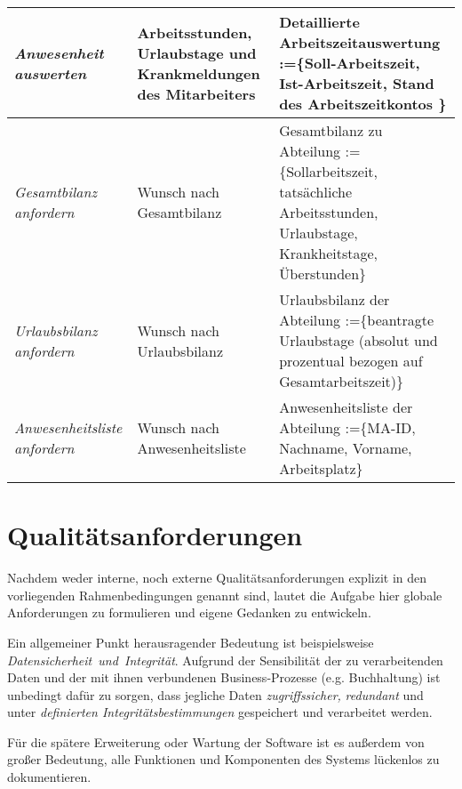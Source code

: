 {\begin{tabular}{|p{3cm}|p{6cm}|p{6cm}|}
	\hline \hline
		\textit{Anwesenheit \newline auswerten} &
		Arbeitsstunden, Urlaubstage und Krankmeldungen des Mitarbeiters&
		Detaillierte Arbeitszeitauswertung :=\{Soll-Arbeitszeit, Ist-Arbeitszeit, Stand des Arbeitszeitkontos \} \\
	\hline \hline
		\textit{Gesamtbilanz \newline anfordern} &
		Wunsch nach Gesamtbilanz &
		Gesamtbilanz zu Abteilung :=\{Sollarbeitszeit, tats\"achliche Arbeitsstunden, Urlaubstage, Krankheitstage, \"Uberstunden\}\\
	\hline
		\textit{Urlaubsbilanz \newline anfordern} &
		Wunsch nach Urlaubsbilanz&
		Urlaubsbilanz der Abteilung :=\{beantragte Urlaubstage (absolut und prozentual bezogen auf Gesamtarbeitszeit)\}\\
	\hline
		\textit{Anwesenheitsliste \newline anfordern} &
		Wunsch nach Anwesenheitsliste &
		Anwesenheitsliste der Abteilung :=\{MA-ID, Nachname, Vorname, Arbeitsplatz\} \\
	\hline
\end{tabular}
}


\newpage
\section{Qualit\"atsanforderungen}
Nachdem weder interne, noch externe Qualit\"atsanforderungen explizit in den vorliegenden Rahmenbedingungen genannt sind, lautet die Aufgabe hier globale Anforderungen zu formulieren und eigene Gedanken zu entwickeln. \newline

Ein allgemeiner Punkt herausragender Bedeutung ist beispielsweise \newline \mbox{\textit{Datensicherheit und Integrit\"at}}. Aufgrund der Sensibilit\"at der zu verarbeitenden Daten und der mit ihnen verbundenen Business-Prozesse (e.g. Buchhaltung) ist unbedingt daf\"ur zu sorgen, dass jegliche Daten \textit{zugriffssicher,} \textit{redundant} und unter \textit{definierten Integrit\"atsbestimmungen} gespeichert und verarbeitet werden. \newline

F\"ur die sp\"atere Erweiterung oder Wartung der Software ist es au{\ss}erdem von gro{\ss}er Bedeutung, alle Funktionen und Komponenten des Systems l\"uckenlos zu dokumentieren. \newline
 
